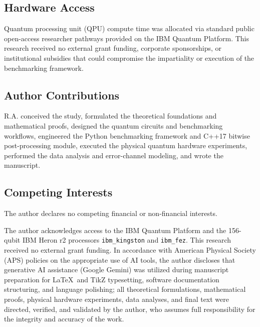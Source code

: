 \documentclass[aps,pra,reprint,superscriptaddress,floatfix,nofootinbib]{revtex4-2}
\begin{document}
\subsection{Hardware Access}
Quantum processing unit (QPU) compute time was allocated via standard public open-access researcher pathways provided on the IBM Quantum Platform. This research received no external grant funding, corporate sponsorships, or institutional subsidies that could compromise the impartiality or execution of the benchmarking framework.

\subsection{Author Contributions}
R.A. conceived the study, formulated the theoretical foundations and mathematical proofs, designed the quantum circuits and benchmarking workflows, engineered the Python benchmarking framework and C++17 bitwise post-processing module, executed the physical quantum hardware experiments, performed the data analysis and error-channel modeling, and wrote the manuscript.

\subsection{Competing Interests}
The author declares no competing financial or non-financial interests.

\begin{acknowledgments}
The author acknowledges access to the IBM Quantum Platform and the 156-qubit IBM Heron r2 processors \texttt{ibm\_kingston} and \texttt{ibm\_fez}. This research received no external grant funding. In accordance with American Physical Society (APS) policies on the appropriate use of AI tools, the author discloses that generative AI assistance (Google Gemini) was utilized during manuscript preparation for \LaTeX\ and TikZ typesetting, software documentation structuring, and language polishing; all theoretical formulations, mathematical proofs, physical hardware experiments, data analyses, and final text were directed, verified, and validated by the author, who assumes full responsibility for the integrity and accuracy of the work.
\end{acknowledgments}
\end{document}
